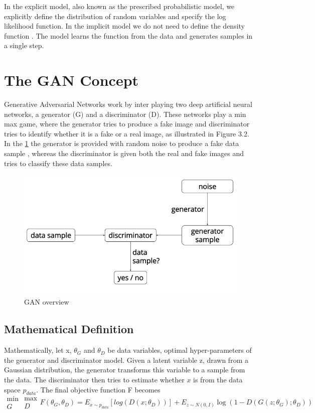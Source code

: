 In the explicit model, also known as the prescribed probabilistic model, we explicitly define the distribution of random variables and specify the log likelihood function.
In the implicit model we do not need to define the density function \cite{1}. The model learns the function from the data and generates samples in a single step.

\section{The GAN  Concept}
Generative Adversarial Networks work by inter playing two deep artificial neural networks, a generator (G) and a discriminator (D). These networks play a min max game, where the generator tries to produce a fake image and discriminator tries to identify whether it is a fake or a real image, as illustrated in Figure 3.2. In the \cref{fig: GAN-Overview} the generator is provided with random noise to produce a fake data sample , whereas the discriminator is given both the real and fake images and tries to classify these data samples.
\begin{figure}[t]

  \centering
    \includegraphics[scale=.4, angle=0]{Files/gan-overview.png}
    \caption[GAN overview]{ GAN overview \cite{Gan-overview}}
    \label{fig: GAN-Overview}
\end{figure}
\newpage
\subsection{Mathematical Definition}
Mathematically, let x,  $\theta_{G}$  and $\theta_{D}$ be data variables, optimal hyper-parameters of the generator and discriminator model.
Given a latent variable z, drawn from a Gaussian distribution, the generator transforms this variable to a sample from the data. The discriminator then tries to estimate whether $x$ is from the data space $p_{data}$. The final objective function F becomes
$$ \substack{\min\\ G} \substack{ \max\\ D} F (\theta_{G}, \theta_{D}) = E_{x\sim p_{data}} [log (D (x; \theta_{D}))] + E_{z\sim N(0,I)}\log (1- D(G (z; \theta_{G}) ; \theta_{D}))$$
